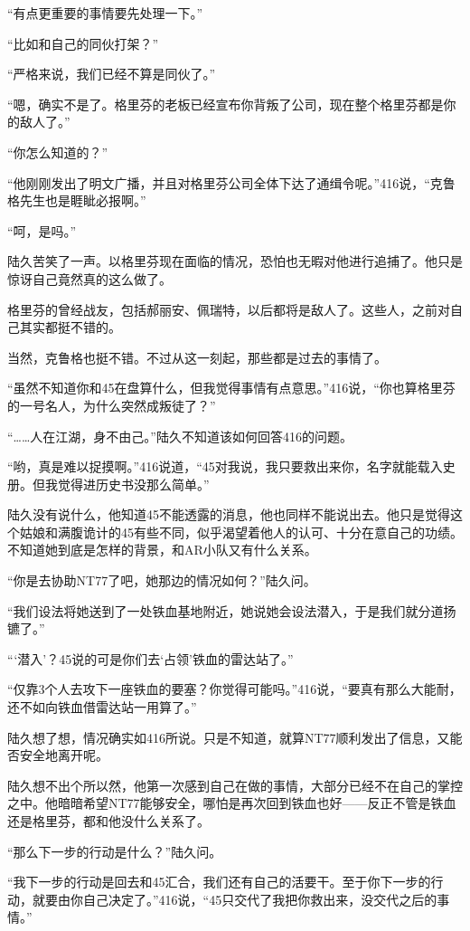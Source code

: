 “有点更重要的事情要先处理一下。”

“比如和自己的同伙打架？”

“严格来说，我们已经不算是同伙了。”

“嗯，确实不是了。格里芬的老板已经宣布你背叛了公司，现在整个格里芬都是你的敌人了。”

“你怎么知道的？”

“他刚刚发出了明文广播，并且对格里芬公司全体下达了通缉令呢。”416说，“克鲁格先生也是睚眦必报啊。”

“呵，是吗。”

陆久苦笑了一声。以格里芬现在面临的情况，恐怕也无暇对他进行追捕了。他只是惊讶自己竟然真的这么做了。

格里芬的曾经战友，包括郝丽安、佩瑞特，以后都将是敌人了。这些人，之前对自己其实都挺不错的。

当然，克鲁格也挺不错。不过从这一刻起，那些都是过去的事情了。

“虽然不知道你和45在盘算什么，但我觉得事情有点意思。”416说，“你也算格里芬的一号名人，为什么突然成叛徒了？”

“……人在江湖，身不由己。”陆久不知道该如何回答416的问题。

“哟，真是难以捉摸啊。”416说道，“45对我说，我只要救出来你，名字就能载入史册。但我觉得进历史书没那么简单。”

陆久没有说什么，他知道45不能透露的消息，他也同样不能说出去。他只是觉得这个姑娘和满腹诡计的45有些不同，似乎渴望着他人的认可、十分在意自己的功绩。不知道她到底是怎样的背景，和AR小队又有什么关系。

“你是去协助NT77了吧，她那边的情况如何？”陆久问。

“我们设法将她送到了一处铁血基地附近，她说她会设法潜入，于是我们就分道扬镳了。”

“‘潜入’？45说的可是你们去‘占领’铁血的雷达站了。”

“仅靠3个人去攻下一座铁血的要塞？你觉得可能吗。”416说，“要真有那么大能耐，还不如向铁血借雷达站一用算了。”

陆久想了想，情况确实如416所说。只是不知道，就算NT77顺利发出了信息，又能否安全地离开呢。

陆久想不出个所以然，他第一次感到自己在做的事情，大部分已经不在自己的掌控之中。他暗暗希望NT77能够安全，哪怕是再次回到铁血也好——反正不管是铁血还是格里芬，都和他没什么关系了。

“那么下一步的行动是什么？”陆久问。

“我下一步的行动是回去和45汇合，我们还有自己的活要干。至于你下一步的行动，就要由你自己决定了。”416说，“45只交代了我把你救出来，没交代之后的事情。”

